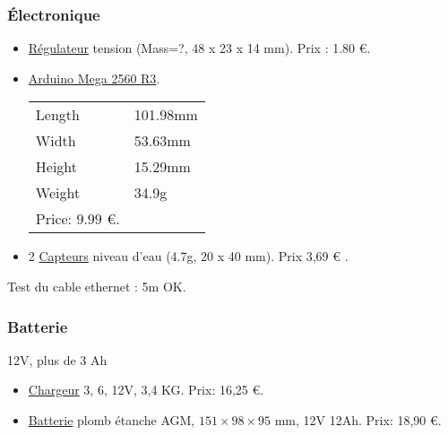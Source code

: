 \documentclass[11pt,a4paper]{article}
\newcommand{\PAYE}{{\Large\color{orange}\checkmark}}
\begin{document}
      \subsubsection{Électronique  \PAYE}
        \begin{itemize}
          \item \href{http://www.amazon.fr/LM2596-Abaisseur-Régulateur-Tension-Ajustable/dp/B00GSY3UBS/ref=pd_cp_147_1?ie=UTF8&refRID=19H2WCT90TTWCF32P1HK}{Régulateur} tension (Mass=?, 48 x 23 x 14 mm). Prix : {\color{red} 1.80 €}.
          \item \href{http://www.miniinthebox.com/fr/mega-2560-conseil-du-developpement-r3-conseil-atmega2560-16au-pour-arduino_p903300.html}{Arduino Mega 2560 R3}. \\
          \begin{tabular}{ll}
            
          
            Length & 101.98mm \\
            Width & 53.63mm \\
            Height & 15.29mm \\
            Weight & 34.9g\\
            Price: {\color{red}$9.99$ €}.
          \end{tabular}
          
          
          
          \item 2 \href{http://www.ebay.fr/itm/2-modules-detection-pluie-eau-Water-Sensor-pour-Arduino-envoi-de-France-E137-/201370405351?pt=LH_DefaultDomain_71&hash=item2ee29c89e7}{Capteurs} niveau d'eau (4.7g, 20 x 40 mm). Prix {\color{red} 3,69 €} \PAYE.
        \end{itemize}
        Test du cable ethernet : 5m OK.

        
      
      \subsubsection{Batterie \PAYE}
        12V, plus de 3 Ah
        \begin{itemize}
          \item \href{http://www.amazon.fr/gp/product/B001CNZP6S?psc=1&redirect=true&ref_=od_aui_detailpages00}{Chargeur} 3, 6, 12V,  3,4 KG. Prix: {\color{red} 16,25 €}.
          \item \href{http://www.amazon.fr/Batterie-plomb-AGM-12V-12Ah-12Ah/dp/B008FZ0WEG}{Batterie} plomb étanche AGM, $151 \times 98 \times 95$ mm, 12V 12Ah. Prix: {\color{red} 18,90 €}.
        \end{itemize}
        
\end{document}
